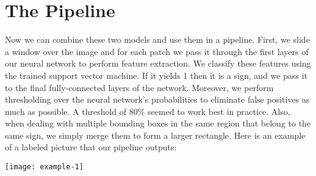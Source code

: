 \section{The Pipeline}
Now we can combine these two models and use them in a pipeline. First, we slide a window over the image and for each patch we pass it through the first layers of our neural network to perform feature extraction. We classify these features using the trained support vector machine. If it yields 1 then it is a sign, and we pass it to the final fully-connected layers of the network. Moreover, we perform thresholding over the neural network's probabilities to eliminate false positives as much as possible. A threshold of $80\%$ seemed to work best in practice. Also, when dealing with multiple bounding boxes in the same region that belong to the same sign, we simply merge them to form a larger rectangle. Here is an example of a labeled picture that our pipeline outputs:
\begin{center}
\texttt{[image: example-1]}
\end{center}